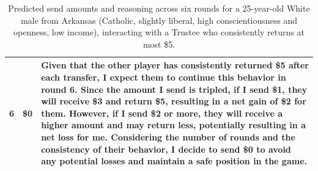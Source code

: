\documentclass{article} %
\begin{document}
\begin{appendices}
\begin{table}[h]
\begin{tabular}{c|c|p{10.2cm}}
\midrule
6 & \$0 & Given that the other player has consistently returned \$5 after each transfer, I expect them to continue this behavior in round 6. Since the amount I send is tripled, if I send \$1, they will receive \$3 and return \$5, resulting in a net gain of \$2 for them. However, if I send \$2 or more, they will receive a higher amount and may return less, potentially resulting in a net loss for me. Considering the number of rounds and the consistency of their behavior, I decide to send \$0 to avoid any potential losses and maintain a safe position in the game. \\
\bottomrule
\end{tabular}
\caption{Predicted send amounts and reasoning across six rounds for a 25-year-old White male from Arkansas (Catholic, slightly liberal, high conscientiousness and openness, low income), interacting with a Trustee who consistently returns at most \$5.}
\label{tab:individual-belief-sample-5}
\end{table}



\end{appendices}
\end{document}
